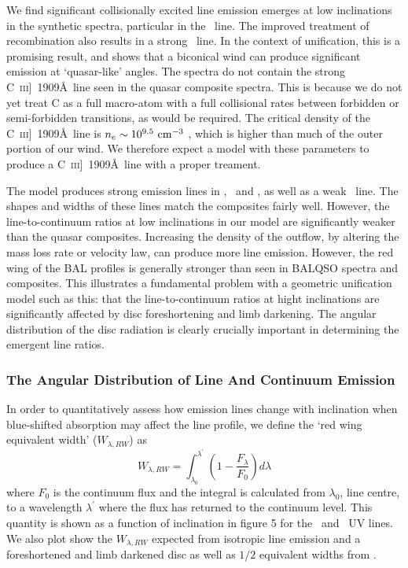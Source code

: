 \documentclass[useAMS,usenatbib]{mn2e_x}
\begin{document}
We find significant collisionally excited line emission emerges
at low inclinations in the synthetic spectra, particular in the \civ\ line.
The improved treatment of recombination also results in a strong \la\ line. 
In the context of unification, this is a promising result, 
and shows that a biconical wind can produce significant 
emission at `quasar-like' angles. 
The spectra do not contain the strong C~\textsc{iii}]~1909\AA\, 
line seen in the quasar composite spectra. 
This is because we do not yet treat C as a full macro-atom with a 
full collisional rates between forbidden
or semi-forbidden transitions, as would be required.
The critical density of the C~\textsc{iii}]~1909\AA\, line 
is $n_e\sim10^{9.5}~\rm{cm^{-3}}$ \citep{wei1988}, which is higher than much of the 
outer portion of our wind. 
We therefore expect a model with these 
parameters to produce a C~\textsc{iii}]~1909\AA\ line
with a proper treament. 

The model produces strong emission lines in \civ, \nv\ and \la,
as well as a weak \mg\ line. The shapes and widths of these lines
match the composites fairly well. However, the line-to-continuum ratios 
at low inclinations in our model are significantly weaker than the quasar 
composites. Increasing the density of the outflow, by altering the mass 
loss rate  or velocity law, can produce more line emission.
However, the red wing of the BAL profiles is generally stronger than 
seen in BALQSO spectra and composites. This illustrates a fundamental 
problem with a geometric unification model such as this:
that the line-to-continuum ratios at hight inclinations are
significantly affected by disc foreshortening and limb darkening.
The angular distribution of the disc radiation is clearly
crucially important in determining the emergent line ratios.

\subsubsection{The Angular Distribution of Line And Continuum Emission}
\label{angular}

In order to quantitatively assess how emission lines change with 
inclination when blue-shifted absorption 
may affect the line profile, we define the `red wing equivalent width' ($W_{\lambda,RW}$) as
\begin{equation}
W_{\lambda,RW} = \int_{\lambda_0}^{\lambda^\prime} \left( 1 - \frac{F_\lambda}{F_0} \right) d\lambda
\label{rwew}
\end{equation}
where $F_0$ is the continuum flux and the integral is calculated from $\lambda_0$, line centre,
to a wavelength $\lambda^\prime$ where the flux has returned to the continuum level.
This quantity is shown as a function of inclination in figure 5 for the \civ\ and \mg\ UV lines.
We also plot show the $W_{\lambda,RW}$ expected from isotropic line emission and a foreshortened 
and limb darkened disc  as well as $1/2$ equivalent widths from \cite{dipompeo2012b}. 
\end{document}
